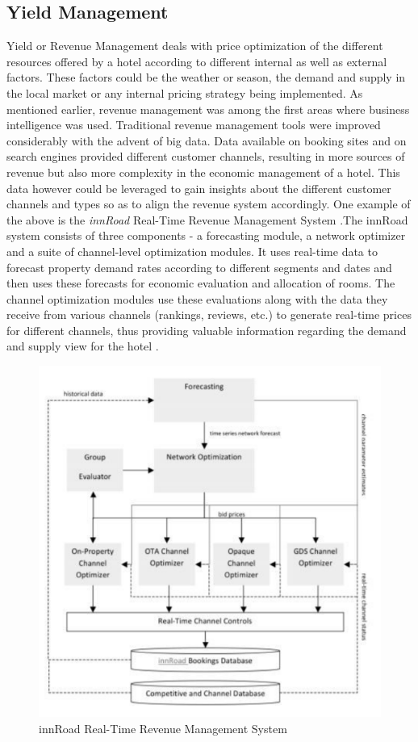 \documentclass[sigconf]{acmart}
\begin{document}
\subsection{Yield Management}
Yield or Revenue Management deals with price optimization of the different resources offered by a hotel according to different internal as well as external factors. These factors could be the weather or season, the demand and supply in the local market or any internal pricing strategy being implemented.
\newline As mentioned earlier, revenue management was among the first areas where business intelligence was used. Traditional revenue management tools were improved considerably with the advent of big data. Data available on booking sites and on search engines provided different customer channels, resulting in more sources of revenue but also more complexity in the economic management of a hotel. This data however could be leveraged to gain insights about the different customer channels and types so as to align the revenue system accordingly. One example of the above is the {\em innRoad} Real-Time Revenue Management System \cite {bigdatarevenue09}.The innRoad system consists of three components - a forecasting module, a network optimizer and a suite of channel-level optimization modules. It uses real-time data to forecast property demand rates according to different segments and dates and then uses these forecasts for economic evaluation and allocation of rooms. The channel optimization modules use these evaluations along with the data they receive from various channels (rankings, reviews, etc.) to generate real-time prices for different channels, thus providing valuable information regarding the demand and supply view for the hotel \cite {bigdatarevenue09}.
\begin{figure}
	\includegraphics[width=\columnwidth]{images/innRoad.pdf}
	\caption{innRoad Real-Time Revenue Management System \cite {bigdatarevenue09}}
        \label{F:Figure3}
\end{figure}
\end{document}
